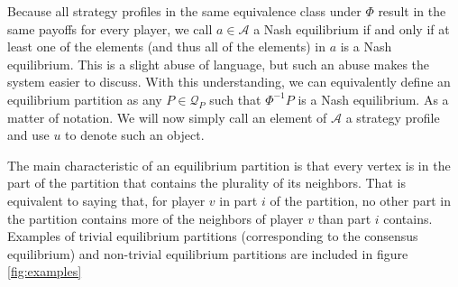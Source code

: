 \documentclass{article}
\begin{document}
Because all strategy profiles in the same equivalence class under $\Phi$ result in the same payoffs for every player, we call $a\in \mathcal{A}$ a Nash equilibrium if and only if at least one of the elements (and thus all of the elements) in $a$ is a Nash equilibrium. This is a slight abuse of language, but such an abuse makes the system easier to discuss. With this understanding, we can equivalently define an equilibrium partition as any $P\in \mathcal{Q}_P$ such that $\Phi^{-1}P$ is a Nash equilibrium. As a matter of notation. We will now simply call an element of $\mathcal{A}$ a strategy profile and use $u$ to denote such an object. 

The main characteristic of an equilibrium partition is that every vertex is in the part of the partition that contains the plurality of its neighbors. That is equivalent to saying that, for player $v$ in part $i$ of the partition, no other part in the partition contains more of the neighbors of player $v$ than part $i$ contains. Examples of trivial equilibrium partitions (corresponding to the consensus equilibrium) and non-trivial equilibrium partitions are included in figure \ref{fig:examples} 
\end{document}
